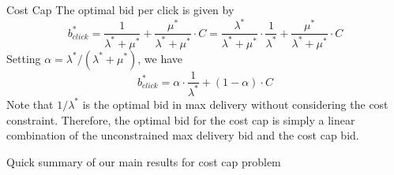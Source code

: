 \documentclass[../main.tex]{subfiles}
\begin{document}
\begin{section}{Cost Cap}
	The optimal bid per click is given by 
	\begin{equation}
		b^*_{click} = \frac{1}{\lambda^* + \mu^*} + \frac{\mu^*}{\lambda^* + \mu^*} \cdot C =  \frac{\lambda^*}{\lambda^* + \mu^*} \cdot \frac{1}{\lambda^*}+ \frac{\mu^*}{\lambda^* + \mu^*} \cdot C
	\end{equation}
    Setting $\alpha = \lambda^*/(\lambda^* + \mu^*)$, we have 
    \begin{equation}
    	b^*_{click}  =  \alpha \cdot \frac{1}{\lambda^*}+ (1-\alpha) \cdot C
    \end{equation}
	Note that \(1 / \lambda^*\) is the optimal bid in max delivery without considering the cost constraint. Therefore, the optimal bid for the cost cap is simply a linear combination of the unconstrained max delivery bid and the cost cap bid.
	
		Quick summary of our main results for cost cap problem
	
	\end{section}
	
\end{document}
